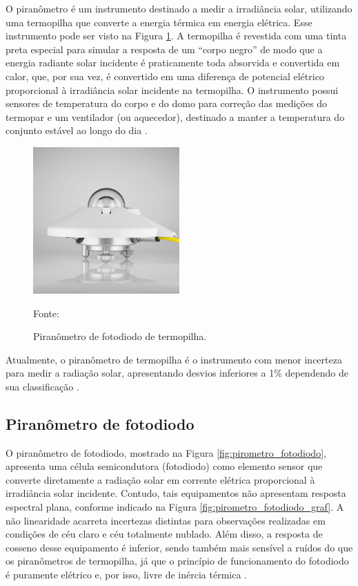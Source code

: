 O piranômetro é um instrumento destinado a medir a irradiância solar, utilizando uma termopilha que converte a energia térmica em energia elétrica. Esse instrumento pode ser visto na Figura \ref{fig:pirometro_termo}. A termopilha é revestida com uma tinta preta especial para simular a resposta de um “corpo negro” de modo que a energia radiante solar incidente é praticamente toda absorvida e convertida em calor, que, por sua vez, é convertido em uma diferença de potencial elétrico proporcional à irradiância solar incidente na termopilha. O instrumento possui sensores de temperatura do corpo e do domo para correção das medições do termopar e um ventilador (ou aquecedor), destinado a manter a temperatura do conjunto estável ao longo do dia \cite{atlas2017}.

\begin{figure}[H]
    \centering
    \includegraphics[width=0.5\textwidth]{./Figuras/pirometro_termo.jpg}
    \caption{ Piranômetro de fotodiodo de termopilha.}{Fonte: \cite{kippzonen}}
   \label{fig:pirometro_termo}
\end{figure}

Atualmente, o piranômetro de termopilha é o instrumento com menor incerteza para medir a radiação solar, apresentando desvios inferiores a 1\% dependendo de sua classificação \cite{atlas2017}.

\subsection{Piranômetro de fotodiodo}

O piranômetro de fotodiodo, mostrado na Figura \ref{fig:pirometro_fotodiodo}, apresenta uma célula semicondutora (fotodiodo) como elemento sensor que converte diretamente a radiação solar em corrente elétrica proporcional à irradiância solar incidente. Contudo, tais equipamentos não apresentam resposta espectral plana, conforme indicado na Figura \ref{fig:pirometro_fotodiodo_graf}. A não linearidade acarreta incertezas distintas para observações realizadas em condições de céu claro e céu totalmente nublado. Além disso, a resposta de cosseno desse equipamento é inferior, sendo também mais sensível a ruídos do que os piranômetros de termopilha, já que o princípio de funcionamento do fotodiodo é puramente elétrico e, por isso, livre de inércia térmica \cite{atlas2017}.

